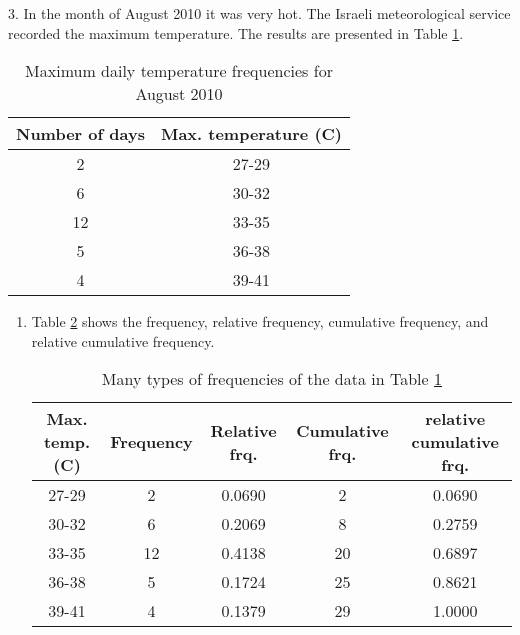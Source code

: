 \documentclass[fleqn]{article}
\begin{document}
\begin{answers}
	\item[3.]
	In the month of August 2010 it was very hot. The Israeli meteorological service recorded the maximum temperature. The results are presented in Table \ref{q3-temperature}.
	\begin{table}
		\centering
		\begin{tabular}{||c|c||}
			\hline
			Number of days & Max. temperature (\degree C) \\
			\hline
			2	& 27-29 \\
			6	& 30-32 \\
			12	& 33-35 \\
			5	& 36-38 \\
			4	& 39-41 \\
			\hline
		\end{tabular}
		\caption{Maximum daily temperature frequencies for August 2010}
		\label{q3-temperature}
	\end{table}
	\begin{enumerate}
		\item %
		Table \ref{q3-frequencies} shows the frequency, relative frequency, cumulative frequency, and relative cumulative frequency.
		\begin{table}[ht]
			\centering
			\begin{tabular}{||c||c|c|c|c||}
				\hline
				Max. temp. (\degree C) & Frequency & Relative frq. & Cumulative frq. & relative cumulative frq. \\
				\hline
				27-29 & 2	& 0.0690 & 2	& 0.0690 \\
				30-32 & 6	& 0.2069 & 8	& 0.2759 \\
				33-35 & 12	& 0.4138 & 20	& 0.6897 \\
				36-38 & 5	& 0.1724 & 25	& 0.8621 \\
				39-41 & 4	& 0.1379 & 29	& 1.0000 \\
				\hline
			\end{tabular}
			\caption{Many types of frequencies of the data in Table \ref{q3-temperature}}
			\label{q3-frequencies}
		\end{table}


\end{enumerate}
\end{answers}
\end{document}
